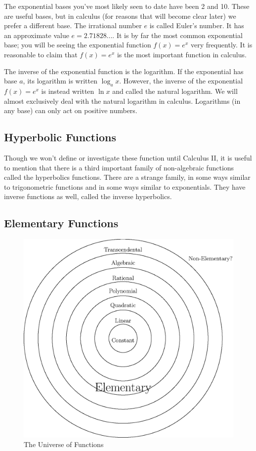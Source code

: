 \documentclass[fleqn]{report}
\begin{document}
The exponential bases you've most likely seen to
date have been 2 and 10. These are useful bases, but in
calculus (for reasons that will become clear later) we prefer
a different base. The irrational number $e$ is called Euler's
number. It has an approximate
value $e = 2.71828\ldots$. It is by far the most common
exponential base; you will be seeing the exponential function
$f(x) = e^x$ very frequently. It is reasonable to claim that 
$f(x) = e^x$ is the most important function in calculus.

The inverse of the exponential function is the logarithm. If the
exponential has base $a$, its logarithm is written
$\log_a x$. However, the inverse of the exponential $f(x) =
e^x$ is instead written $\ln x$ and
called the natural logarithm. We
will almost exclusively deal with the natural logarithm in
calculus. Logarithms (in any base) can only act on positive
numbers.

\subsection{Hyperbolic Functions}
\label{hyperbolic-functions}

Though we won't define or investigate these function until
Calculus II, it is useful to mention that there is a third important
family of non-algebraic functions called the hyperbolics
functions. There are a strange family, in some ways similar
to trigonometric functions and in some ways similar to
exponentials. They have inverse functions as well, called the
inverse hyperbolics. 

\subsection{Elementary Functions}
\label{elementary}

\begin{figure}[t]
\centering
\includegraphics[width=12cm]{figure35.eps}
\caption{The Universe of Functions}
\label{figure-universe-of-functions}
\end{figure}
\end{document}
